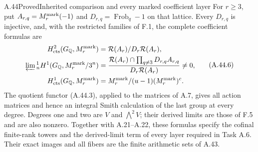 \begin{statement}{A.44}{Proved}{Inherited comparison and every marked coefficient layer}
For $r\ge3$, put $A_{r,q}=M_r^{\rm mark}(-1)$ and
$D_{r,q}=\operatorname{Frob}_q-1$ on that lattice.
Every $D_{r,q}$ is injective, and, with the restricted
families of F.1, the complete coefficient formulas are
\[
\begin{split}
 H^2_{\rm cts}(G_{\mathbb Q},M_r^{\rm mark})
    &=\mathcal R(A_r)/D_r\mathcal R(A_r),\\
 \varprojlim{}^1_n H^1(G_{\mathbb Q},M_r^{\rm mark}/3^n)
    &=\frac{\mathcal R(A_r)\cap
                   \prod_{q\ne3}D_{r,q}A_{r,q}}
                 {D_r\mathcal R(A_r)}\ne0,\\
 H^1_{\rm cts}(G_{\mathbb Q},M_r^{\rm mark})
    &=M_r^{\rm mark}/(u-1)(M_r^{\rm mark})^c.
\end{split}
 \tag{A.44.6}
\]
The quotient functor (A.44.3), applied to the matrices
of A.7, gives all action matrices and hence an integral
Smith calculation of the last group at every degree.
Degrees one and two are $V$ and $\bigwedge^2V$; their
derived limits are those of F.5 and are also nonzero.
Together with A.21--A.22, these formulas specify the
cofinal finite-rank towers and the derived-limit term
of every layer required in Task A.6. Their exact images
and all fibers are the finite arithmetic sets of A.43.
\end{statement}
